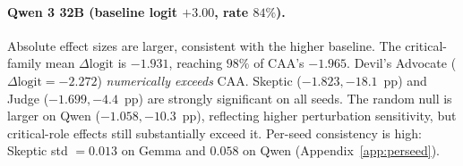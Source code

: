 \documentclass{article}
\theoremstyle{plain}
\theoremstyle{definition}
\theoremstyle{remark}
\begin{document}
\paragraph{Qwen 3 32B (baseline logit $+3.00$, rate $84\%$).}
Absolute effect sizes are larger, consistent with the higher baseline. The critical-family mean $\Delta\mathrm{logit}$ is $-1.931$, reaching $98\%$ of CAA's $-1.965$. Devil's Advocate ($\Delta\mathrm{logit}=-2.272$) \emph{numerically exceeds} CAA. Skeptic ($-1.823, -18.1$~pp) and Judge ($-1.699, -4.4$~pp) are strongly significant on all seeds. The random null is larger on Qwen ($-1.058, -10.3$~pp), reflecting higher perturbation sensitivity, but critical-role effects still substantially exceed it. Per-seed consistency is high: Skeptic std $=0.013$ on Gemma and $0.058$ on Qwen (Appendix~\ref{app:perseed}).
\end{document}
